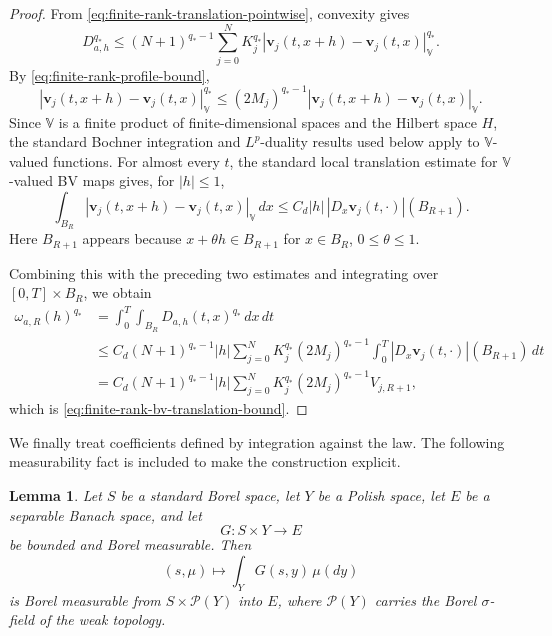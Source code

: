 \documentclass[12pt,oneside, reqno]{amsart}
\newtheorem{lemma}[theorem]{Lemma}
\numberwithin{equation}{section}
\begin{document}
	\begin{proof}
		From \eqref{eq:finite-rank-translation-pointwise}, convexity gives
		\[
		D_{a,h}^{q_\ast}
		\leq
		(N+1)^{q_\ast-1}
		\sum_{j=0}^N
		K_j^{q_\ast}
		|\mathbf v_j(t,x+h)-\mathbf v_j(t,x)|_{\mathbb V}^{q_\ast}.
		\]
		By \eqref{eq:finite-rank-profile-bound},
		\[
		|\mathbf v_j(t,x+h)-\mathbf v_j(t,x)|_{\mathbb V}^{q_\ast}
		\leq
		(2M_j)^{q_\ast-1}
		|\mathbf v_j(t,x+h)-\mathbf v_j(t,x)|_{\mathbb V}.
		\]
		Since \(\mathbb V\) is a finite product of finite-dimensional spaces and the Hilbert space \(H\), the standard Bochner integration and \(L^p\)-duality results used below apply to \(\mathbb V\)-valued functions.
	For almost every \(t\), the standard local translation estimate for
	\(\mathbb V\)-valued BV maps gives, for \(|h|\leq 1\),
	\[
	\int_{B_R}
	\left|\mathbf v_j(t,x+h)-\mathbf v_j(t,x)\right|_{\mathbb V}\,dx
	\leq
	C_d |h| \, |D_x\mathbf v_j(t,\cdot)|(B_{R+1}).
	\]
	Here \(B_{R+1}\) appears because
	\(x+\theta h\in B_{R+1}\) for \(x\in B_R\), \(0\leq\theta\leq1\).

	Combining this with the preceding two estimates and integrating over
	\([0,T]\times B_R\), we obtain
	\[
	\begin{aligned}
		\omega_{a,R}(h)^{q_\ast}
		&=
		\int_0^T\int_{B_R}D_{a,h}(t,x)^{q_\ast}\,dx\,dt
		\\
		&\leq
		C_d(N+1)^{q_\ast-1}|h|
		\sum_{j=0}^N
		K_j^{q_\ast}(2M_j)^{q_\ast-1}
		\int_0^T
		|D_x\mathbf v_j(t,\cdot)|(B_{R+1})\,dt
		\\
		&=
		C_d(N+1)^{q_\ast-1}|h|
		\sum_{j=0}^N
		K_j^{q_\ast}(2M_j)^{q_\ast-1}V_{j,R+1},
	\end{aligned}
	\]
	which is \eqref{eq:finite-rank-bv-translation-bound}.
	\end{proof}
	
	We finally treat coefficients defined by integration against the law. The
	following measurability fact is included to make the construction explicit.
	
	\begin{lemma}
		\label{lem:parameterized-bochner-integration}
		Let \(S\) be a standard Borel space, let \(Y\) be a Polish space, let
		\(E\) be a separable Banach space, and let
		\[
		G:S\times Y\longrightarrow E
		\]
		be bounded and Borel measurable. Then
		\[
		(s,\mu)
		\longmapsto
		\int_Y G(s,y)\,\mu(dy)
		\]
		is Borel measurable from \(S\times\mathcal P(Y)\) into \(E\), where
		\(\mathcal P(Y)\) carries the Borel \(\sigma\)-field of the weak topology.
	\end{lemma}
	
\end{document}
